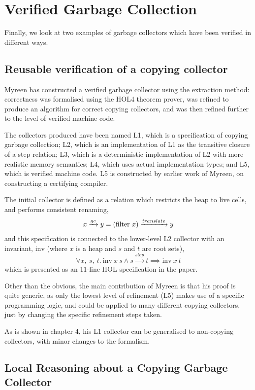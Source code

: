 \section{Verified Garbage Collection}
\label{sec:lit-verifiedgc}

Finally, we look at two examples of \glspl{garbage collector} which
have been verified in different ways.

\subsection{Reusable verification of a copying collector}
\label{sec:lit-verifiedgc-myreen}

Myreen\cite{Myreen10} has constructed a verified \gls{garbage
  collector} using the extraction method: correctness was formalised
using the HOL4 theorem prover, was refined to produce an algorithm for
correct \gls{copying} \glspl{collector}, and was then refined further
to the level of verified machine code.

The \glspl{collector} produced have been named L1, which is a
specification of copying \gls{garbage collection}; L2, which is an
implementation of L1 as the transitive closure of a step relation; L3,
which is a deterministic implementation of L2 with more realistic
memory semantics; L4, which uses actual implementation types; and L5,
which is verified machine code. L5 is constructed by earlier work of
Myreen, on constructing a certifying compiler.

The initial \gls{collector} is defined as a relation which restricts
the heap to live cells, and performs consistent renaming, \[x \xrightarrow{gc} y =
(\mathrm{filter}~x) \xrightarrow{translate} y\] and this specification is connected
to the lower-level L2 collector with an invariant, $\mathrm{inv}$
(where $x$ is a heap and $s$ and $t$ are root sets), \[\forall
x,~s,~t.\ \mathrm{inv}~x~s \land s \xrightarrow{step} t \implies
\mathrm{inv}~x~t\] which is presented as an 11-line HOL specification
in the paper.

Other than the obvious, the main contribution of Myreen is that his
proof is quite generic, as only the lowest level of refinement (L5)
makes use of a specific programming logic, and could be applied to many
different copying collectors, just by changing the specific refinement
steps taken.

As is shown in chapter 4, his L1 collector can be generalised to
non-copying collectors, with minor changes to the formalism.

\subsection{Local Reasoning about a Copying Garbage Collector}
\label{sec:lit-verifiedgc-birkedal}

